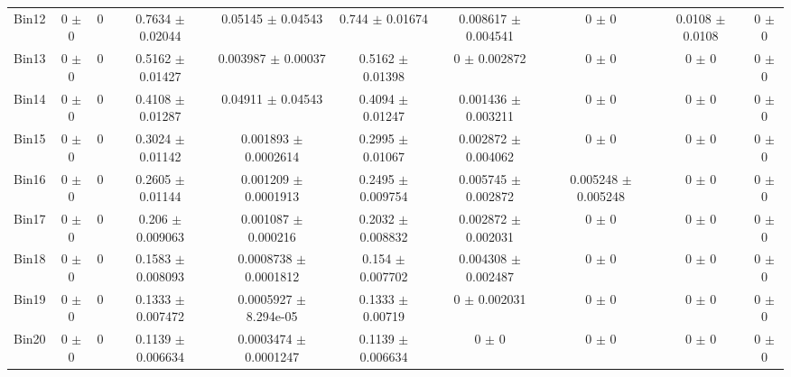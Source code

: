 \begin{tabular}{@{\extracolsep{4pt}}lccccccccc@{}}
     Bin12 & 0 $\pm$ 0 & 0 & 0.7634 $\pm$ 0.02044 & 0.05145 $\pm$ 0.04543 & 0.744 $\pm$ 0.01674 & 0.008617 $\pm$ 0.004541 & 0 $\pm$ 0 & 0.0108 $\pm$ 0.0108 & 0 $\pm$ 0 \\ 
     Bin13 & 0 $\pm$ 0 & 0 & 0.5162 $\pm$ 0.01427 & 0.003987 $\pm$ 0.00037 & 0.5162 $\pm$ 0.01398 & 0 $\pm$ 0.002872 & 0 $\pm$ 0 & 0 $\pm$ 0 & 0 $\pm$ 0 \\ 
     Bin14 & 0 $\pm$ 0 & 0 & 0.4108 $\pm$ 0.01287 & 0.04911 $\pm$ 0.04543 & 0.4094 $\pm$ 0.01247 & 0.001436 $\pm$ 0.003211 & 0 $\pm$ 0 & 0 $\pm$ 0 & 0 $\pm$ 0 \\ 
     Bin15 & 0 $\pm$ 0 & 0 & 0.3024 $\pm$ 0.01142 & 0.001893 $\pm$ 0.0002614 & 0.2995 $\pm$ 0.01067 & 0.002872 $\pm$ 0.004062 & 0 $\pm$ 0 & 0 $\pm$ 0 & 0 $\pm$ 0 \\ 
     Bin16 & 0 $\pm$ 0 & 0 & 0.2605 $\pm$ 0.01144 & 0.001209 $\pm$ 0.0001913 & 0.2495 $\pm$ 0.009754 & 0.005745 $\pm$ 0.002872 & 0.005248 $\pm$ 0.005248 & 0 $\pm$ 0 & 0 $\pm$ 0 \\ 
     Bin17 & 0 $\pm$ 0 & 0 & 0.206 $\pm$ 0.009063 & 0.001087 $\pm$ 0.000216 & 0.2032 $\pm$ 0.008832 & 0.002872 $\pm$ 0.002031 & 0 $\pm$ 0 & 0 $\pm$ 0 & 0 $\pm$ 0 \\ 
     Bin18 & 0 $\pm$ 0 & 0 & 0.1583 $\pm$ 0.008093 & 0.0008738 $\pm$ 0.0001812 & 0.154 $\pm$ 0.007702 & 0.004308 $\pm$ 0.002487 & 0 $\pm$ 0 & 0 $\pm$ 0 & 0 $\pm$ 0 \\ 
     Bin19 & 0 $\pm$ 0 & 0 & 0.1333 $\pm$ 0.007472 & 0.0005927 $\pm$ 8.294e-05 & 0.1333 $\pm$ 0.00719 & 0 $\pm$ 0.002031 & 0 $\pm$ 0 & 0 $\pm$ 0 & 0 $\pm$ 0 \\ 
     Bin20 & 0 $\pm$ 0 & 0 & 0.1139 $\pm$ 0.006634 & 0.0003474 $\pm$ 0.0001247 & 0.1139 $\pm$ 0.006634 & 0 $\pm$ 0 & 0 $\pm$ 0 & 0 $\pm$ 0 & 0 $\pm$ 0 \\ 
\hline\hline
  \end{tabular}

